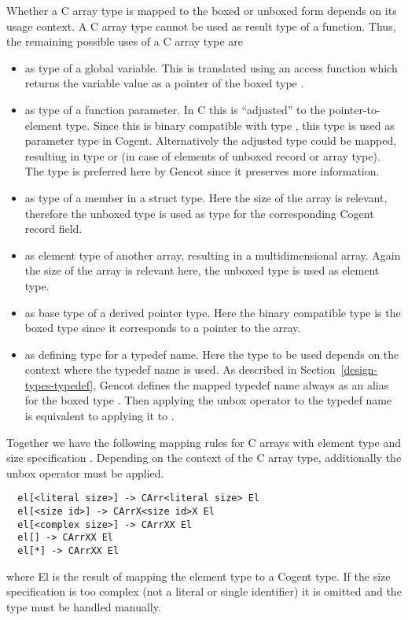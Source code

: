 Whether a C array type is mapped to the boxed or unboxed form depends on its usage context.
A C array type cannot be used as result type of a function. Thus, the remaining possible uses of a C array type are
\begin{itemize}
\item as type of a global variable. This is translated using an access function which returns the variable
value as a pointer of the boxed type .
\item as type of a function parameter. In C this is ``adjusted'' to the pointer-to-element type. Since this
is binary compatible with type , this type is used as parameter type in Cogent. Alternatively 
the adjusted type could be mapped, resulting in type  or  (in case of elements of unboxed 
record or array type). The type  is preferred here by Gencot since it preserves more information.
\item as type of a member in a struct type. Here the size of the array is relevant, therefore the unboxed type
 is used as type for the corresponding Cogent record field.
\item as element type of another array, resulting in a multidimensional array. Again the size of the array 
is relevant here, the unboxed type  is used as element type.
\item as base type of a derived pointer type. Here the binary compatible type is the boxed type 
since it corresponds to a pointer to the array.
\item as defining type for a typedef name. Here the type to be used depends on the context where the typedef
name is used. As described in Section~\ref{design-types-typedef}, Gencot defines the mapped 
typedef name always as an alias for the boxed type . Then applying the unbox operator to the typedef name 
is equivalent to applying it to .
\end{itemize}

Together we have the following mapping rules for C arrays with element type  and size 
specification . Depending on the context of the C array type, additionally the unbox operator must be applied.
\begin{verbatim}
  el[<literal size>] -> CArr<literal size> El
  el[<size id>] -> CArrX<size id>X El
  el[<complex size>] -> CArrXX El
  el[] -> CArrXX El
  el[*] -> CArrXX El
\end{verbatim}
where El is the result of mapping the element type  to a Cogent type. If the size specification
is too complex (not a literal or single identifier) it is omitted and the type must be handled manually.

